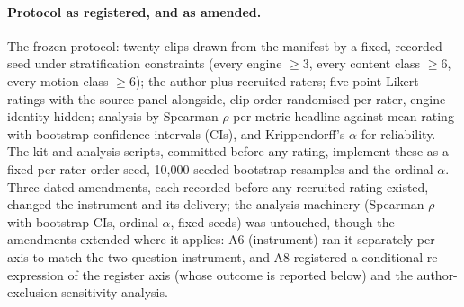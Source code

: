 \documentclass[11pt]{article}
\begin{document}
\paragraph{Protocol as registered, and as amended.} The frozen protocol:
twenty clips drawn from the manifest by a fixed, recorded seed under
stratification constraints (every engine $\geq 3$, every content class
$\geq 6$, every motion class $\geq 6$); the author plus recruited raters;
five-point Likert ratings with the source panel alongside, clip order
randomised per rater, engine identity hidden;
analysis by Spearman $\rho$ per metric headline against mean rating with
bootstrap confidence intervals (CIs), and Krippendorff's
$\alpha$ for reliability. The kit and analysis scripts, committed before any
rating, implement these as a fixed per-rater order seed, 10{,}000 seeded
bootstrap resamples and the ordinal $\alpha$. Three dated amendments, each recorded before any
recruited rating existed, changed the instrument and its delivery; the analysis
machinery (Spearman $\rho$ with bootstrap CIs, ordinal $\alpha$, fixed
seeds) was untouched, though the amendments extended where it applies: A6
(instrument) ran it separately per axis to match the two-question instrument, and A8
registered a conditional re-expression of the register axis (whose outcome is
reported below) and the author-exclusion sensitivity analysis.
\end{document}
